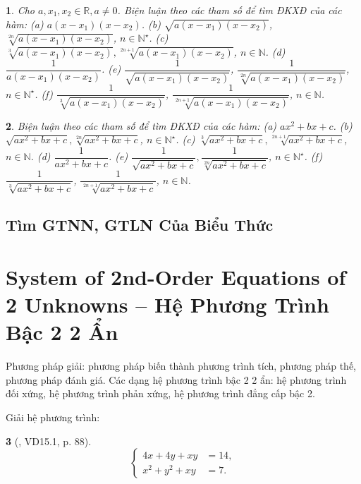 \documentclass{article}
\newtheorem{baitoan}{}
\begin{document}
\begin{baitoan}
	Cho $a,x_1,x_2\in\mathbb{R},a\ne0$. Biện luận theo các tham số để tìm {\rm ĐKXĐ} của các hàm: (a) $a(x - x_1)(x - x_2)$. (b) $\sqrt{a(x - x_1)(x - x_2)}$, $\sqrt[2n]{a(x - x_1)(x - x_2)}$, $n\in\mathbb{N}^\star$. (c) $\sqrt[3]{a(x - x_1)(x - x_2)},\sqrt[2n + 1]{a(x - x_1)(x - x_2)}$, $n\in\mathbb{N}$. (d) $\dfrac{1}{a(x - x_1)(x - x_2)}$. (e) $\dfrac{1}{\sqrt{a(x - x_1)(x - x_2)}}$, $\dfrac{1}{\sqrt[2n]{a(x - x_1)(x - x_2)}}$, $n\in\mathbb{N}^\star$. (f) $\dfrac{1}{\sqrt[3]{a(x - x_1)(x - x_2)}}$, $\dfrac{1}{\sqrt[2n+1]{a(x - x_1)(x - x_2)}}$, $n\in\mathbb{N}$.
\end{baitoan}

\begin{baitoan}
	Biện luận theo các tham số để tìm {\rm ĐKXĐ} của các hàm: (a) $ax^2 + bx + c$. (b) $\sqrt{ax^2 + bx + c},\sqrt[2n]{ax^2 + bx + c}$, $n\in\mathbb{N}^\star$. (c) $\sqrt[3]{ax^2 + bx + c},\sqrt[2n + 1]{ax^2 + bx + c}$, $n\in\mathbb{N}$. (d) $\dfrac{1}{ax^2 + bx + c}$. (e) $\dfrac{1}{\sqrt{ax^2 + bx + c}},\dfrac{1}{\sqrt[2n]{ax^2 + bx + c}}$, $n\in\mathbb{N}^\star$. (f) $\dfrac{1}{\sqrt[3]{ax^2 + bx + c}}$, $\dfrac{1}{\sqrt[2n+1]{ax^2 + bx + c}}$, $n\in\mathbb{N}$.
\end{baitoan}

\subsection{Tìm GTNN, GTLN Của Biểu Thức}


\section{System of 2nd-Order Equations of 2 Unknowns -- Hệ Phương Trình Bậc 2 2 Ẩn}
 Phương pháp giải: phương pháp biến thành phương trình tích, phương pháp thế, phương pháp đánh giá.  Các dạng hệ phương trình bậc 2 2 ẩn: hệ phương trình đối xứng, hệ phương trình phản xứng, hệ phương trình đẳng cấp bậc 2.

Giải hệ phương trình:

\begin{baitoan}[\cite{TLCT_THCS_Toan_9_dai_so}, VD15.1, p. 88]
	\begin{equation*}
		\left\{\begin{split}
			4x + 4y + xy &= 14,\\
			x^2 + y^2 + xy &= 7.
		\end{split}\right.
	\end{equation*}
\end{baitoan}
\end{document}
